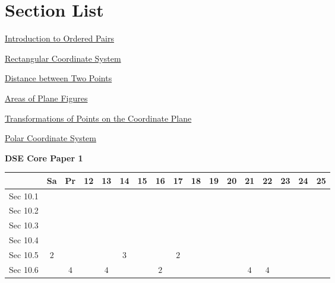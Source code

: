 \documentclass[12pt, a4paper]{article}
\begin{document}
\section*{Section List}
\begin{enumx}[label=Sec 10.\arabic*\ ]
\item \hyperref[section:1-10-1]{Introduction to Ordered Pairs}
\item \hyperref[section:1-10-2]{Rectangular Coordinate System}
\item \hyperref[section:1-10-3]{Distance between Two Points}
\item \hyperref[section:1-10-4]{Areas of Plane Figures}
\item \hyperref[section:1-10-5]{Transformations of Points on the Coordinate Plane}
\item \hyperref[section:1-10-6]{Polar Coordinate System}
\end{enumx}
\begin{absolutelynopagebreak}
\begin{center}
\textbf{DSE Core Paper 1}
\end{center}
\begin{center}
\begin{tabular}{|l|c|c|c|c|c|c|c|c|c|c|c|c|c|c|c|c|}
\hline
        & Sa & Pr & 12 & 13 & 14 & 15 & 16 & 17 & 18 & 19 & 20 & 21 & 22 & 23 & 24 & 25 \\\hline\hline
Sec 10.1 &  &  &  &  &  &  &  &  &  &  &  &  &  &  &  &  \\\hline
Sec 10.2 &  &  &  &  &  &  &  &  &  &  &  &  &  &  &  &  \\\hline
Sec 10.3 &  &  &  &  &  &  &  &  &  &  &  &  &  &  &  &  \\\hline
Sec 10.4 &  &  &  &  &  &  &  &  &  &  &  &  &  &  &  &  \\\hline
Sec 10.5 &  $2$ &  &  &  &  $3$ &  &  &  $2$ &  &  &  &  &  &  &  &  \\\hline
Sec 10.6 &  &  $4$ &  &  $4$ &  &  &  $2$ &  &  &  &  &  $4$ &  $4$ &  &  &  \\\hline
\end{tabular}
\end{center}
\end{absolutelynopagebreak}
\end{document}
